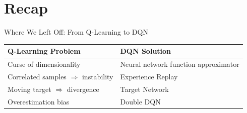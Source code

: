 \section{Recap}
\begin{frame}{Where We Left Off: From Q-Learning to DQN}
    \begin{table}[]
        \centering
        \renewcommand{\arraystretch}{2.0}
        \begin{tabular}{>{\raggedright\arraybackslash}p{4.5cm} >{\raggedright\arraybackslash}p{5.5cm}}
            \hline
            \textbf{Q-Learning Problem} & \textbf{DQN Solution} \\
            \hline
            Curse of dimensionality & Neural network function approximator \\
            Correlated samples $\Rightarrow$ instability & Experience Replay \\
            Moving target $\Rightarrow$ divergence & Target Network \\
            Overestimation bias & Double DQN \\
            \hline
        \end{tabular}
    \end{table}
\end{frame}